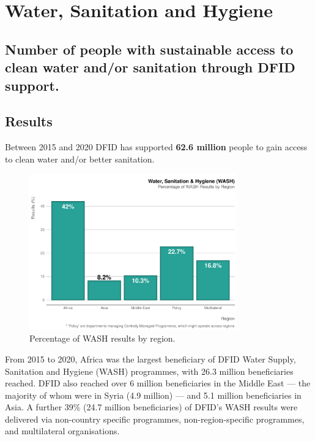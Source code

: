 \chapter{Water, Sanitation and Hygiene}

\section*{Number of people with sustainable access to clean water and/or sanitation through DFID support.}
\thispagestyle{empty}



\section{Results}

Between 2015 and 2020 DFID has supported \textbf{
62.6 million} people to gain access to clean water and/or better sanitation. %

\begin{figure}[htbp]
	\centering
\begin{knitrout}
\color{fgcolor}
\includegraphics[width=0.8\textwidth]{figs/wash_region_plot-1} 

\end{knitrout}
	\caption{Percentage of WASH results by region.}
	\label{fig:wash_region_plot}
\end{figure}


From 2015 to 2020, Africa was the largest beneficiary of DFID Water Supply, Sanitation and Hygiene (WASH) programmes, with 26.3 million beneficiaries reached. %
DFID also reached over 6 million beneficiaries in the Middle East --- the majority of whom were in Syria (4.9 million) --- and 5.1 million beneficiaries in Asia. %
A further 39\% (24.7 million beneficiaries) of DFID's WASH results were delivered via non-country specific programmes, non-region-specific programmes, and multilateral organisations. %

